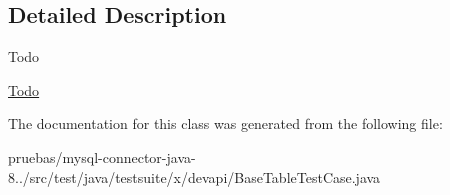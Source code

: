 \subsection{Detailed Description}
\begin{DoxyRefDesc}{Todo}
\item[\mbox{\hyperlink{todo__todo000004}{Todo}}]\end{DoxyRefDesc}


The documentation for this class was generated from the following file\+:\begin{DoxyCompactItemize}
\item 
pruebas/mysql-\/connector-\/java-\/8../src/test/java/testsuite/x/devapi/Base\+Table\+Test\+Case.\+java\end{DoxyCompactItemize}

